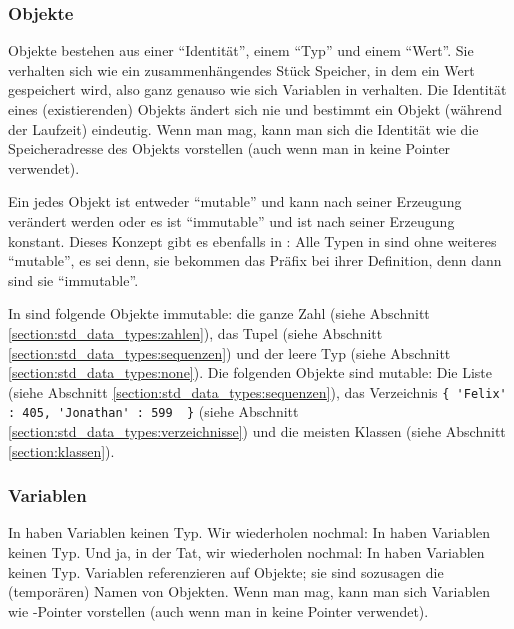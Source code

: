 \subsubsection{Objekte}
\label{section:datamodel:python:objekte}
Objekte bestehen aus einer ``Identität'', einem ``Typ'' und einem ``Wert''.
Sie verhalten sich wie ein zusammenhängendes Stück Speicher, in dem ein Wert gespeichert wird,
also ganz genauso wie sich Variablen in \CC verhalten.
Die Identität eines (existierenden) Objekts ändert sich nie und bestimmt ein Objekt (während der Laufzeit) eindeutig.
Wenn man mag, kann man sich die Identität wie die Speicheradresse des Objekts vorstellen (auch wenn man in \Python keine Pointer verwendet).

Ein jedes Objekt ist entweder ``mutable'' und kann nach seiner Erzeugung verändert werden oder es ist ``immutable'' und ist nach seiner Erzeugung konstant.
Dieses Konzept gibt es ebenfalls in \CC:
Alle Typen in \CC sind ohne weiteres ``mutable'', es sei denn, sie bekommen das Präfix  bei ihrer Definition, denn dann sind sie ``immutable''.

In \Python sind folgende Objekte immutable:
die ganze Zahl  (siehe Abschnitt \ref{section:std_data_types:zahlen}),
das Tupel  (siehe Abschnitt \ref{section:std_data_types:sequenzen}) und
der leere Typ  (siehe Abschnitt \ref{section:std_data_types:none}).
Die folgenden Objekte sind mutable:
Die Liste \lpy{[1, 'a']} (siehe Abschnitt \ref{section:std_data_types:sequenzen}),
das Verzeichnis \lstinline[style=Pyinline]|{ 'Felix' : 405, 'Jonathan' : 599  }| (siehe Abschnitt \ref{section:std_data_types:verzeichnisse})
und die meisten Klassen (siehe Abschnitt \ref{section:klassen}).


\subsubsection{Variablen}
\label{section:datamodel:python:variablen}
In \Python haben Variablen keinen Typ.
Wir wiederholen nochmal: In \Python haben Variablen keinen Typ.
Und ja, in der Tat, wir wiederholen nochmal: In \Python haben Variablen keinen Typ.
Variablen referenzieren auf Objekte; sie sind sozusagen die (temporären) Namen von Objekten.
Wenn man mag, kann man sich Variablen wie -Pointer vorstellen (auch wenn man in \Python keine Pointer verwendet).

